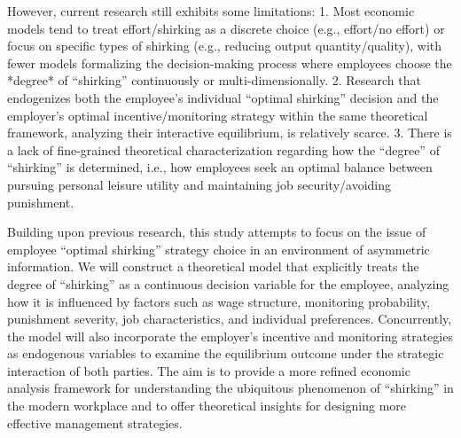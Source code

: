 However, current research still exhibits some limitations:
1.  Most economic models tend to treat effort/shirking as a discrete choice (e.g., effort/no effort) or focus on specific types of shirking (e.g., reducing output quantity/quality), with fewer models formalizing the decision-making process where employees choose the *degree* of \enquote{shirking} continuously or multi-dimensionally.
2.  Research that endogenizes both the employee's individual \enquote{optimal shirking} decision and the employer's optimal incentive/monitoring strategy within the same theoretical framework, analyzing their interactive equilibrium, is relatively scarce.
3.  There is a lack of fine-grained theoretical characterization regarding how the \enquote{degree} of \enquote{shirking} is determined, i.e., how employees seek an optimal balance between pursuing personal leisure utility and maintaining job security/avoiding punishment.

Building upon previous research, this study attempts to focus on the issue of employee \enquote{optimal shirking} strategy choice in an environment of asymmetric information. We will construct a theoretical model that explicitly treats the degree of \enquote{shirking} as a continuous decision variable for the employee, analyzing how it is influenced by factors such as wage structure, monitoring probability, punishment severity, job characteristics, and individual preferences. Concurrently, the model will also incorporate the employer's incentive and monitoring strategies as endogenous variables to examine the equilibrium outcome under the strategic interaction of both parties. The aim is to provide a more refined economic analysis framework for understanding the ubiquitous phenomenon of \enquote{shirking} in the modern workplace and to offer theoretical insights for designing more effective management strategies.